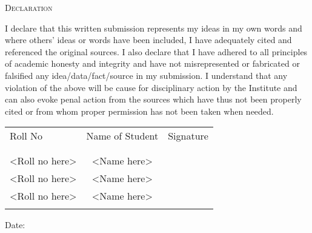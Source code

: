 \newpage
\thispagestyle{empty}

\begin{center}
    \Large \textsc {Declaration}\\[0.5cm]
\end{center}

\normalsize I declare that this written submission represents my ideas in my own words and
where others' ideas or words have been included, I have adequately cited and
referenced the original sources. I also declare that I have adhered to all principles
of academic honesty and integrity and have not misrepresented or fabricated or
falsified any idea/data/fact/source in my submission. I understand that any
violation of the above will be cause for disciplinary action by the Institute and can
also evoke penal action from the sources which have thus not been properly cited
or from whom proper permission has not been taken when needed.

\begin{table}[h]
    \centering
    \begin{tabular}{lcr}
        Roll No        & Name of Student & Signature \\ \\ \hline
        \\
        <Roll no here> & <Name here>     &           \\
        <Roll no here> & <Name here>     &           \\
        <Roll no here> & <Name here>     &           \\ \\ \hline
    \end{tabular}
\end{table}

\vspace{1.0cm}

\begin{flushleft}
    Date:
\end{flushleft}
